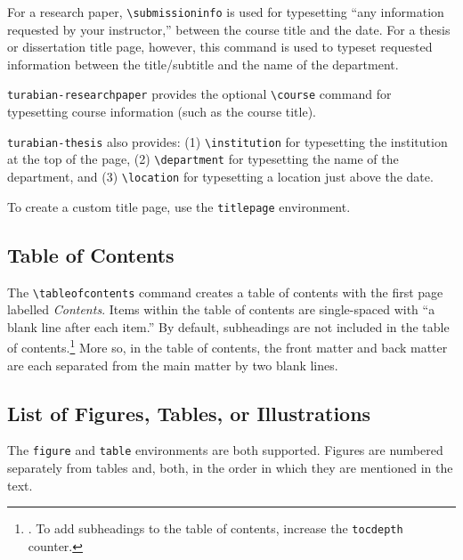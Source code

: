 \documentclass{article}
\newcommand{\textcmd}[1]{\texttt{\textbackslash #1}}
\begin{document}
For a research paper, \textcmd{submissioninfo} is used for typesetting ``any information requested by your instructor,'' between the course title and the date.\autocite[388]{turabian_manual_2018} For a thesis or dissertation title page, however, this command is used to typeset requested information between the title/subtitle and the name of the department.

\texttt{turabian-researchpaper} provides the optional \textcmd{course} command for typesetting course information (such as the course title).

\texttt{turabian-thesis} also provides: (1) \textcmd{institution} for typesetting the institution at the top of the page, (2) \textcmd{department} for typesetting the name of the department, and (3) \textcmd{location} for typesetting a location just above the date.

To create a custom title page, use the \texttt{titlepage} environment.


\subsection{Table of Contents}
\label{subsec:toc}

\marginnote{\textcmd{tableofcontents}}
The \textcmd{tableofcontents} command creates a table of contents with the first page labelled \emph{Contents}. Items within the table of contents are single-spaced with ``a blank line after each item.'' By default, subheadings are not included in the table of contents.\footnote{%
	\autocite[390]{turabian_manual_2018}. To add subheadings to the table of contents, increase the \texttt{tocdepth} counter.}
More so, in the table of contents, the front matter and back matter are each separated from the main matter by two blank lines.\autocite[390]{turabian_manual_2018}


\subsection{List of Figures, Tables, or Illustrations}
\label{subsec:toft}

The \texttt{figure} and \texttt{table} environments are both supported. Figures are numbered separately from tables and, both, in the order in which they are mentioned in the text.\autocite[375, 381]{turabian_manual_2018}
\end{document}
